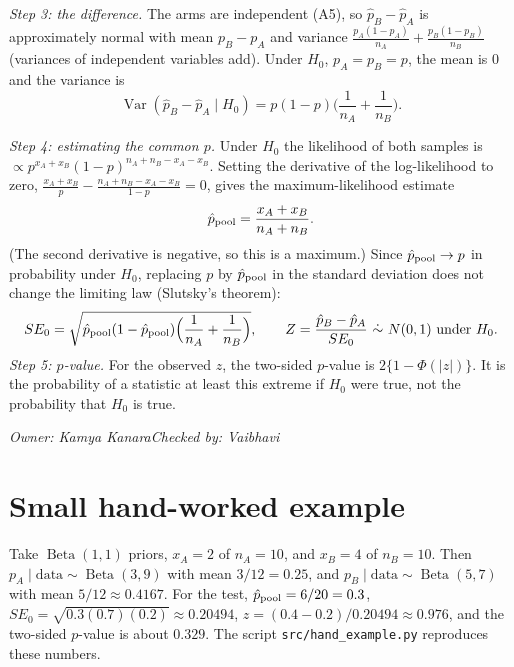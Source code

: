 \documentclass[11pt]{article}
\newcommand{\signoff}[2]{\par\smallskip\noindent\textit{Owner: #1\quad Checked by: #2}\par}
\newcommand{\Var}{\operatorname{Var}}
\newcommand{\Beta}{\operatorname{Beta}}
\begin{document}
\emph{Step 3: the difference.} The arms are independent (A5), so $\hat p_B-\hat p_A$ is approximately normal with mean $p_B-p_A$ and variance $\frac{p_A(1-p_A)}{n_A}+\frac{p_B(1-p_B)}{n_B}$ (variances of independent variables add). Under $H_0$, $p_A=p_B=p$, the mean is $0$ and the variance is
\[
\Var(\hat p_B-\hat p_A\mid H_0)=p(1-p)\Big(\frac1{n_A}+\frac1{n_B}\Big).
\]

\emph{Step 4: estimating the common $p$.} Under $H_0$ the likelihood of both samples is $\propto p^{x_A+x_B}(1-p)^{n_A+n_B-x_A-x_B}$. Setting the derivative of the log-likelihood to zero, $\frac{x_A+x_B}{p}-\frac{n_A+n_B-x_A-x_B}{1-p}=0$, gives the maximum-likelihood estimate
\[
\hat p_{\rm pool}=\frac{x_A+x_B}{n_A+n_B}.
\]
(The second derivative is negative, so this is a maximum.) Since $\hat p_{\rm pool}\to p$ in probability under $H_0$, replacing $p$ by $\hat p_{\rm pool}$ in the standard deviation does not change the limiting law (Slutsky's theorem):
\[
SE_0=\sqrt{\hat p_{\rm pool}(1-\hat p_{\rm pool})\Big(\frac1{n_A}+\frac1{n_B}\Big)},\qquad
Z=\frac{\hat p_B-\hat p_A}{SE_0}\ \dot\sim\ N(0,1)\ \text{under }H_0 .
\]
\emph{Step 5: $p$-value.} For the observed $z$, the two-sided $p$-value is $2\{1-\Phi(|z|)\}$. It is the probability of a statistic at least this extreme if $H_0$ were true, not the probability that $H_0$ is true.
\signoff{Kamya Kanara}{Vaibhavi}

\section{Small hand-worked example}
Take $\Beta(1,1)$ priors, $x_A=2$ of $n_A=10$, and $x_B=4$ of $n_B=10$. Then $p_A\mid\text{data}\sim\Beta(3,9)$ with mean $3/12=0.25$, and $p_B\mid\text{data}\sim\Beta(5,7)$ with mean $5/12\approx0.4167$. For the test, $\hat p_{\rm pool}=6/20=0.3$, $SE_0=\sqrt{0.3(0.7)(0.2)}\approx0.20494$, $z=(0.4-0.2)/0.20494\approx0.976$, and the two-sided $p$-value is about $0.329$. The script \texttt{src/hand\_example.py} reproduces these numbers.
\end{document}

